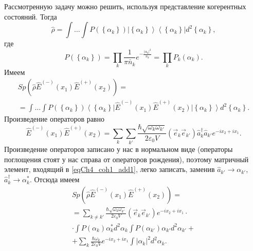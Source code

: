 Рассмотренную задачу можно решить, используя представление когерентных
состояний. Тогда
\begin{equation}
\hat{\rho} = \int \dots \int P\left(\left\{\alpha_k\right\}\right)
\left|\left\{\alpha_k\right\}\right>\left<\left\{\alpha_k\right\}\right|d^2 \left\{\alpha_k\right\},
\nonumber
\end{equation}
где
\begin{equation}
P\left(\left\{\alpha_k\right\}\right) = \prod_k\frac{1}{\pi
  \bar{n}_k}e^{-\frac{\left|\alpha_k\right|^2}{\bar{n}_k}}=
\prod_k P_k\left(\alpha_k\right).
\nonumber
\end{equation}
Имеем
\begin{eqnarray}
Sp \left(
\hat{\rho}\hat{E}^{(-)}\left(x_1\right)
\hat{E}^{(+)}\left(x_2\right)
\right) = 
\nonumber \\
= \int \dots \int
P\left(\left\{\alpha_k\right\}\right)
\left<\left\{\alpha_k\right\}\right|
\hat{E}^{(-)}\left(x_1\right)
\hat{E}^{(+)}\left(x_2\right)
\left|\left\{\alpha_k\right\}\right>
d^2 \left\{\alpha_k\right\}.
\label{eqCh4_coh1_add1}
\end{eqnarray}
Произведение операторов равно
\begin{equation}
\hat{E}^{(-)}\left(x_1\right)
\hat{E}^{(+)}\left(x_2\right) = 
\sum_k \sum_{k'}
\frac{\hbar\sqrt{\omega_{k}\omega_{k'}}}{2 \varepsilon_0 V}
\left(\vec{e}_{k}\vec{e}_{k'}\right)\hat{a}^{\dag}_{k}\hat{a}_{k'}
e^{-i x_2 + i x_1}.
\nonumber
\end{equation}
Произведение операторов записано у нас в нормальном виде (операторы
поглощения стоят у нас справа от операторов рождения), поэтому
матричный элемент, входящий в \eqref{eqCh4_coh1_add1}, легко записать,
заменив $\hat{a}_{k'} \rightarrow \alpha_{k'}$, $\hat{a}^{\dag}_{k}
\rightarrow \alpha^{*}_{k}$. Отсюда имеем
\begin{eqnarray}
Sp \left(
\hat{\rho}\hat{E}^{(-)}\left(x_1\right)
\hat{E}^{(+)}\left(x_2\right)
\right) = 
\nonumber \\
= 
\sum_{k \ne k'}
\frac{\hbar\sqrt{\omega_{k}\omega_{k'}}}{2 \varepsilon_0 V}
\left(\vec{e}_{k}\vec{e}_{k'}\right)
e^{-i x_2 + i x_1}
\cdot
\nonumber \\
\cdot
\int 
P\left(\alpha_{k}\right)
\alpha^{*}_{k}
d^2 \alpha_{k} 
\int 
P\left(\alpha_{k'}\right)
\alpha_{k'}
d^2 \alpha_{k'} +
\nonumber \\
+
\sum_k 
\frac{\hbar\omega_{k}}{2 \varepsilon_0 V}
e^{-i x_2 + i x_1}
\int 
\left|
\alpha_{k}
\right|^2
d^2 \alpha_{k}.
\label{eqCh4_coh1_add2}
\end{eqnarray}
